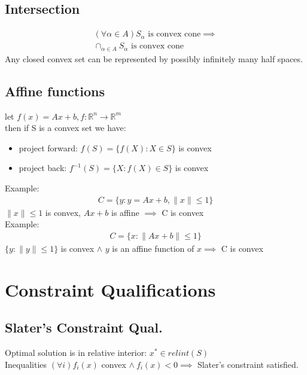 \message{ !name(notebook.tex)}\documentclass[8pt]{report}
\newcommand{\R}{\mathbb{R}}
\newcommand{\norm}[1]{\|#1\|}
\begin{document}
\begin{multicols*}{2}
  \subsection{Intersection}
  \begin{align*}
    (\forall \alpha \in A) S_{\alpha}\text{ is convex cone} \implies\\
    \cap_{\alpha \in A} S_{\alpha} \text{ is convex cone}
  \end{align*}
  Any closed convex set can be represented by possibly infinitely many half spaces.\\
  
  \subsection{Affine functions}
  let $f(x)=Ax+b, f:\R^n \to \R^m$\\
  then if S is a convex set we have:
  \begin{itemize}
  \item project forward: $f(S) = \{ f(X) : X \in S \}$ is convex
  \item project back: $f^{-1}(S) = \{ X : f(X) \in S \}$ is convex
  \end{itemize}
  Example:
  \begin{align*}
    C = \{ y : y=Ax+b, \norm{x} \leq 1\}
  \end{align*}
  $\norm{x} \leq 1$ is convex, $Ax+b$ is affine $\implies$ C is convex\\
  Example:
  \begin{align*}
    C = \{ x : \norm{Ax+b} \leq 1 \}
  \end{align*}
    $\{y: \norm{y} \leq 1 \}$ is convex $\wedge$ $y$ is an affine function of $x \implies$ C is convex\\

  \vfill\null
  \pagebreak

  \section{Constraint Qualifications}

  \subsection{Slater's Constraint Qual.}
  Optimal solution is in relative interior: $x^* \in relint(S)$\\
  
  Inequalities $(\forall i)f_i(x)$ convex $\wedge\ f_i(x)<0 \implies$ Slater's constraint satisfied.\\
  

\end{multicols*}
\end{document}

